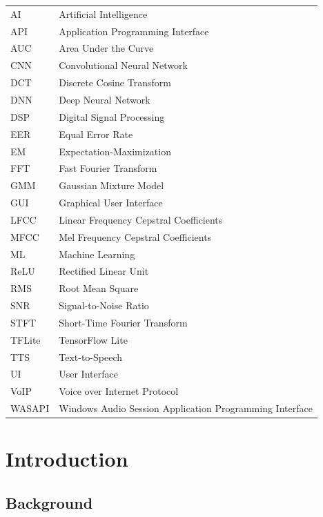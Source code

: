 \documentclass[12pt,a4paper,titlepage]{report}
\begin{document}
    \begin{longtable}{p{3cm} p{10cm}}
    AI & Artificial Intelligence \\
    API & Application Programming Interface \\
    AUC & Area Under the Curve \\
    CNN & Convolutional Neural Network \\
    DCT & Discrete Cosine Transform \\
    DNN & Deep Neural Network \\
    DSP & Digital Signal Processing \\
    EER & Equal Error Rate \\
    EM & Expectation-Maximization \\
    FFT & Fast Fourier Transform \\
    GMM & Gaussian Mixture Model \\
    GUI & Graphical User Interface \\
    LFCC & Linear Frequency Cepstral Coefficients \\
    MFCC & Mel Frequency Cepstral Coefficients \\
    ML & Machine Learning \\
    ReLU & Rectified Linear Unit \\
    RMS & Root Mean Square \\
    SNR & Signal-to-Noise Ratio \\
    STFT & Short-Time Fourier Transform \\
    TFLite & TensorFlow Lite \\
    TTS & Text-to-Speech \\
    UI & User Interface \\
    VoIP & Voice over Internet Protocol \\
    WASAPI & Windows Audio Session Application Programming Interface \\
    \end{longtable}
    
    \newpage
    
	\cleardoublepage
	
	\setcounter{page}{1}
	\chapter{Introduction}
	
	\section{Background}
	
\end{document}
